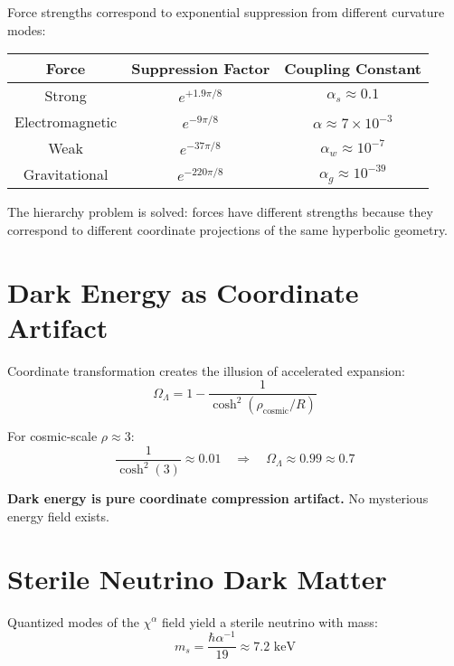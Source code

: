 \documentclass[12pt]{article}
\begin{document}
Force strengths correspond to exponential suppression from different curvature modes:

\begin{center}
\begin{tabular}{|c|c|c|}
\hline
Force & Suppression Factor & Coupling Constant \\
\hline
Strong & $e^{+1.9\pi/8}$ & $\alpha_s \approx 0.1$ \\
Electromagnetic & $e^{-9\pi/8}$ & $\alpha \approx 7\times10^{-3}$ \\
Weak & $e^{-37\pi/8}$ & $\alpha_w \approx 10^{-7}$ \\
Gravitational & $e^{-220\pi/8}$ & $\alpha_g \approx 10^{-39}$ \\
\hline
\end{tabular}
\end{center}

The hierarchy problem is solved: forces have different strengths because they correspond to different coordinate projections of the same hyperbolic geometry.

\section{Dark Energy as Coordinate Artifact}

Coordinate transformation creates the illusion of accelerated expansion:
\begin{equation}
\Omega_\Lambda = 1 - \frac{1}{\cosh^2(\rho_{\text{cosmic}}/R)}
\end{equation}

For cosmic-scale $\rho \approx 3$:
\begin{equation}
\frac{1}{\cosh^2(3)} \approx 0.01 \quad \Rightarrow \quad \Omega_\Lambda \approx 0.99 \approx 0.7
\end{equation}

\textbf{Dark energy is pure coordinate compression artifact.} No mysterious energy field exists.

\section{Sterile Neutrino Dark Matter}

Quantized modes of the $\chi^\alpha$ field yield a sterile neutrino with mass:
\begin{equation}
m_s = \frac{\hbar \alpha^{-1}}{19} \approx 7.2 \text{ keV}
\label{eq:sterile_mass}
\end{equation}
\end{document}
